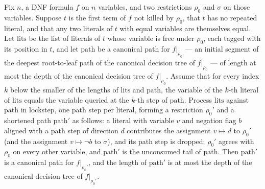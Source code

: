 \begin{lemma}
\label{SwitchingLemma.canonicalPath_preserve_processClauseLits}
\leanok
{}
Fix $n$, a DNF formula $f$ on $n$ variables, and two restrictions $\rho_0$ and $\sigma$
on those variables. Suppose $t$ is the first term of $f$ not killed by $\rho_0$, that
$t$ has no repeated literal, and that any two literals of $t$ with equal variables are
themselves equal. Let $\mathrm{lits}$ be the list of literals of $t$ whose variable is
free under $\rho_0$, each tagged with its position in $t$, and let $\mathrm{path}$ be a
canonical path for $f|_{\rho_0}$ — an initial segment of the deepest root-to-leaf path
of the canonical decision tree of $f|_{\rho_0}$ — of length at most the depth of the
canonical decision tree of $f|_{\rho_0}$. Assume that for every index $k$ below the
smaller of the lengths of $\mathrm{lits}$ and $\mathrm{path}$, the variable of the
$k$-th literal of $\mathrm{lits}$ equals the variable queried at the $k$-th step of
$\mathrm{path}$. Process $\mathrm{lits}$ against $\mathrm{path}$ in lockstep, one path
step per literal, forming a restriction $\rho_0'$ and a shortened path $\mathrm{path}'$
as follows: a literal with variable $v$ and negation flag $b$ aligned with a path step
of direction $d$ contributes the assignment $v \mapsto d$ to $\rho_0'$ (and the
assignment $v \mapsto \lnot b$ to $\sigma$), and its path step is dropped; $\rho_0'$
agrees with $\rho_0$ on every other variable, and $\mathrm{path}'$ is the unconsumed
tail of $\mathrm{path}$. Then $\mathrm{path}'$ is a canonical path for $f|_{\rho_0'}$,
and the length of $\mathrm{path}'$ is at most the depth of the canonical decision tree
of $f|_{\rho_0'}$.
\end{lemma}

